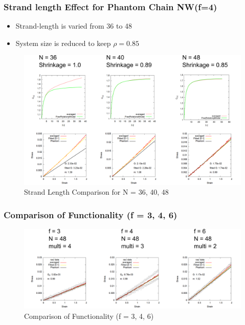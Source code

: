 \documentclass[12pt, dvipdfmx]{beamer}
\begin{document}
\begin{frame}
	\frametitle{
		Strand length Effect for Phantom Chain NW(f=4)
	}
	\begin{itemize}
		\item Strand-length is varied from 36 to 48
		\item System size is reduced to keep $\rho = 0.85$
	\end{itemize}

	\begin{figure}[htb]
		\centering
			\includegraphics[width=.8\textwidth]{N36_N40_N48.png}
			\caption{Strand Length Comparison for N = 36, 40, 48}
			\label{4_N364048}
	\end{figure}

\end{frame}

\begin{frame}
	\frametitle{
		Comparison of Functionality (f = 3, 4, 6)
	}

	\begin{figure}[htb]
		\centering
			\includegraphics[width=.9\textwidth]{compare_346.png}
			\caption{Comparison of Functionality (f = 3, 4, 6)}
			\label{N48_f346}
	\end{figure}

\end{frame}
\end{document}
